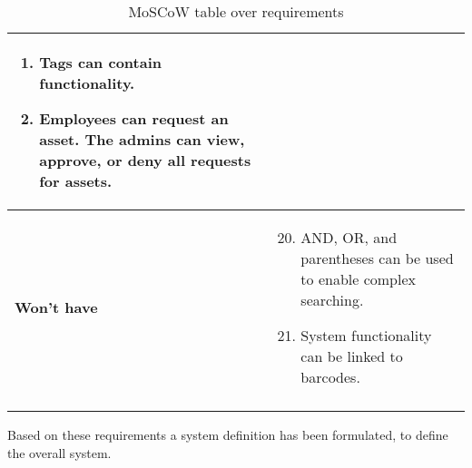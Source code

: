 \begin{longtable}{p{3.2cm} p{10cm}}
\begin{enumerate}
            \item Tags can contain functionality.  
            
            \item Employees can request an asset. The admins can view, approve, or deny all requests for assets.
            
        \end{enumerate}
        \\
        \hline
        \textbf{Won't have} & 
        \vspace*{-7mm}
        \begin{enumerate} \setcounter{enumi}{19} \itemsep0em 
        
            \item AND, OR, and parentheses can be used to enable complex searching.
            
            \item System functionality can be linked to barcodes.
            
        \end{enumerate}
        \\
        \hline
    \caption{MoSCoW table over requirements}
    \label{tab:moscow}
   
\end{longtable}

Based on these requirements a system definition has been formulated, to define the overall system.